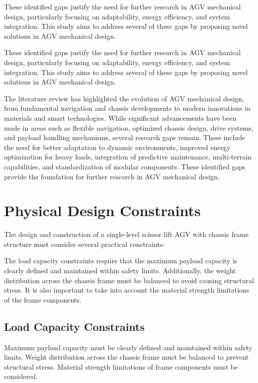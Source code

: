 \documentclass[../../main]{subfiles}
\begin{document}
These identified gaps justify the need for further research in AGV
mechanical design, particularly focusing on adaptability, energy
efficiency, and system integration. This study aims to address several
of these gaps by proposing novel solutions in AGV mechanical design.

These identified gaps justify the need for further research in AGV mechanical design, particularly focusing on adaptability, energy efficiency, and system integration. This study aims to address several of these gaps by proposing novel solutions in AGV mechanical design.

The literature review has highlighted the evolution of AGV mechanical
design, from fundamental navigation and chassis developments to modern
innovations in materials and smart technologies. While significant
advancements have been made in areas such as flexible navigation,
optimized chassis design, drive systems, and payload handling
mechanisms, several research gaps remain. These include the need for
better adaptation to dynamic environments, improved energy optimization
for heavy loads, integration of predictive maintenance, multi-terrain
capabilities, and standardization of modular components. These
identified gaps provide the foundation for further research in AGV
mechanical design.
\newpage
\section{Physical Design Constraints} %

The design and construction of a single-level scissor lift AGV with
chassis frame structure must consider several practical constraints:



The load capacity constraints require that the maximum payload capacity is clearly defined and maintained within safety limits. Additionally, the weight distribution across the chassis frame must be balanced to avoid causing structural stress. It is also important to take into account the material strength limitations of the frame components.

\subsection{Load Capacity Constraints}

Maximum payload capacity must be clearly defined and maintained within safety limits. Weight distribution across the chassis frame must be balanced to prevent structural stress. Material strength limitations of frame components must be considered.
\end{document}

